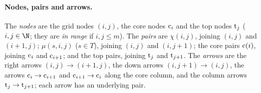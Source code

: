 \paragraph{Nodes, pairs and arrows.} The \emph{nodes} are the grid nodes $(i,j)$, the core nodes $\mathrm{c}_i$ and the top nodes
$\mathrm{t}_j$ ($i,j\in\N$; they are \emph{in range} if $i,j\le m$). The \emph{pairs} are $\chi(i,j)$, joining $(i,j)$ and
$(i+1,j)$; $\mu(s,i,j)$ ($s\in T$), joining $(i,j)$ and $(i,j+1)$; the core pairs $\mathrm{c}(i)$, joining $\mathrm{c}_i$ and
$\mathrm{c}_{i+1}$; and the top pairs, joining $\mathrm{t}_j$ and $\mathrm{t}_{j+1}$. The \emph{arrows} are the right arrows
$(i,j)\to(i+1,j)$, the down arrows $(i,j+1)\to(i,j)$, the arrows $\mathrm{c}_i\to\mathrm{c}_{i+1}$ and $\mathrm{c}_{i+1}\to\mathrm{c}_i$ along
the core column, and the column arrows $\mathrm{t}_j\to\mathrm{t}_{j+1}$; each arrow has an underlying pair.

